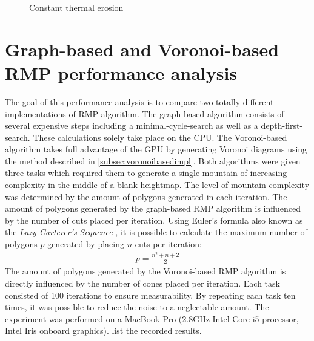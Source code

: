 \documentclass[11pt,a4paper,twoside,openright]{report}
\begin{document}
\begin{figure}[!htb]
  \caption{Constant thermal erosion}\label{fig:thermalafter2}
\endminipage
\end{figure}

\section{Graph-based and Voronoi-based RMP performance analysis}
The goal of this performance analysis is to compare two totally different implementations of RMP algorithm. The graph-based algorithm consists of several expensive steps including a minimal-cycle-search as well as a depth-first-search. These calculations solely take place on the CPU. The Voronoi-based algorithm takes full advantage of the GPU by generating Voronoi diagrams using the method described in \cref{subsec:voronoibasedimpl}. Both algorithms were given three tasks which required them to generate a single mountain of increasing complexity in the middle of a blank heightmap. The level of mountain complexity was determined by the amount of polygons generated in each iteration. The amount of polygons generated by the graph-based RMP algorithm is influenced by the number of cuts placed per iteration. Using Euler's formula also known as the \emph{Lazy Carterer's Sequence} \cite{Moore:1991}, it is possible to calculate the maximum number of polygons $p$ generated by placing $n$ cuts per iteration:
\begin{align}
  p = \frac{n^2 + n + 2}{2}
\end{align}
The amount of polygons generated by the Voronoi-based RMP algorithm is directly influenced by the number of cones placed per iteration. Each task consisted of 100 iterations to ensure measurability. By repeating each task ten times, it was possible to reduce the noise to a neglectable amount. The experiment was performed on a MacBook Pro (2.8GHz Intel Core i5 processor, Intel Iris onboard graphics).  list the recorded results.
\end{document}
